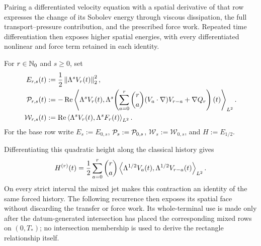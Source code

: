 Pairing a differentiated velocity equation with a spatial derivative of
that row expresses the change of its Sobolev energy through viscous
dissipation, the full transport--pressure contribution, and the prescribed
force work. Repeated time differentiation then exposes higher spatial energies,
with every differentiated nonlinear and force term retained in each identity.

\begin{definition}
\label{def:critical-height-rows}
For \(r\in\mathbb N_0\) and \(s\ge0\), set
\begin{align}
 E_{r,s}(t)&:=\frac12\left\lVert \Lambda^sV_r(t)\right\rVert_2^2,
 \label{eq:temporal-row-spatial-energy}\\
 \mathcal P_{r,s}(t)&:=-\operatorname{Re}
 \left\langle \Lambda^sV_r(t),\Lambda^s\!\left(
   \sum_{a=0}^{r}\binom ra(V_a\cdot\nabla)V_{r-a}+\nabla Q_r
 \right)(t)\right\rangle_{L^2}.
 \label{eq:temporal-row-pressure-complete-transfer}
 \\
 \mathcal W_{r,s}(t)&:=\operatorname{Re}
 \left\langle \Lambda^sV_r(t),\Lambda^sF_r(t)\right\rangle_{L^2}.
 \label{eq:temporal-row-force-work}
\end{align}
For the base row write \(E_s:=E_{0,s}\), \(\mathcal P_s:=\mathcal P_{0,s}\),
\(\mathcal W_s:=\mathcal W_{0,s}\), and \(H:=E_{1/2}\).
\end{definition}

Differentiating this quadratic height along the classical history gives
\[
 H^{(r)}(t)=\frac12\sum_{a=0}^r\binom ra
 \left\langle \Lambda^{1/2}V_a(t),\Lambda^{1/2}V_{r-a}(t)\right\rangle_{L^2}.
\]
On every strict interval the mixed jet makes this contraction an identity of
the same forced history.  The following recurrence then exposes its spatial
face without discarding the transfer or force work.  Its whole-terminal use
is made only after the datum-generated intersection has placed the
corresponding mixed rows on \((0,T_*)\); no intersection membership is used
to derive the rectangle relationship itself.

